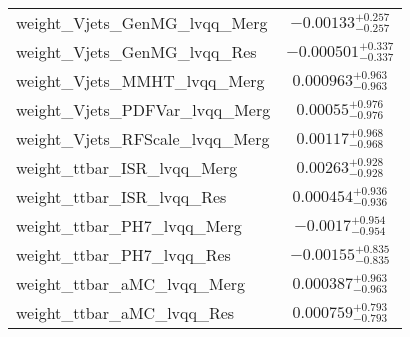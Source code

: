 \begin{tabular}{|l|c|}
weight\_Vjets\_GenMG\_lvqq\_Merg & $-0.00133^{+0.257}_{-0.257}$ \\
weight\_Vjets\_GenMG\_lvqq\_Res & $-0.000501^{+0.337}_{-0.337}$ \\
weight\_Vjets\_MMHT\_lvqq\_Merg & $0.000963^{+0.963}_{-0.963}$ \\
weight\_Vjets\_PDFVar\_lvqq\_Merg & $0.00055^{+0.976}_{-0.976}$ \\
weight\_Vjets\_RFScale\_lvqq\_Merg & $0.00117^{+0.968}_{-0.968}$ \\
weight\_ttbar\_ISR\_lvqq\_Merg & $0.00263^{+0.928}_{-0.928}$ \\
weight\_ttbar\_ISR\_lvqq\_Res & $0.000454^{+0.936}_{-0.936}$ \\
weight\_ttbar\_PH7\_lvqq\_Merg & $-0.0017^{+0.954}_{-0.954}$ \\
weight\_ttbar\_PH7\_lvqq\_Res & $-0.00155^{+0.835}_{-0.835}$ \\
weight\_ttbar\_aMC\_lvqq\_Merg & $0.000387^{+0.963}_{-0.963}$ \\
weight\_ttbar\_aMC\_lvqq\_Res & $0.000759^{+0.793}_{-0.793}$ \\
\hline
\end{tabular}
